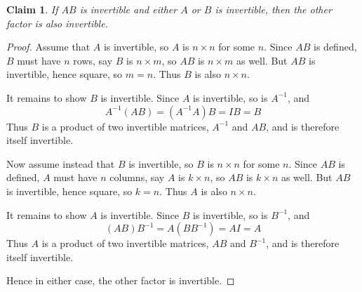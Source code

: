 \documentclass{article}
\newtheorem*{claim}{Claim}
\begin{document}
\begin{claim}
    If $AB$ is invertible and either $A$ or $B$ is invertible, then the other factor is also invertible.
\end{claim}

\begin{proof}
    Assume that $A$ is invertible, so $A$ is $n \times n$ for some $n$. Since $AB$ is defined, $B$ must have 
    $n$ rows, say $B$ is $n \times m$, so $AB$ is $n \times m$ as well. But $AB$ is invertible, hence square, 
    so $m = n$. Thus $B$ is also $n \times n$.

    \medskip

    It remains to show $B$ is invertible. Since $A$ is invertible, so is $A^{-1}$, and
    \[
        A^{-1}(AB) = (A^{-1}A)B = IB = B
    \]
    Thus $B$ is a product of two invertible matrices, $A^{-1}$ and $AB$, and is therefore itself invertible.

    \medskip

    Now assume instead that $B$ is invertible, so $B$ is $n \times n$ for some $n$. Since $AB$ is
    defined, $A$ must have $n$ columns, say $A$ is $k \times n$, so $AB$ is $k \times n$ as well. But $AB$ is
    invertible, hence square, so $k = n$. Thus $A$ is also $n \times n$.

    \medskip

    It remains to show $A$ is invertible. Since $B$ is invertible, so is $B^{-1}$, and
    \[
        (AB)B^{-1} = A(BB^{-1}) = AI = A
    \]
    Thus $A$ is a product of two invertible matrices, $AB$ and $B^{-1}$, and is therefore itself invertible.

    \medskip

    Hence in either case, the other factor is invertible.
\end{proof}
\end{document}
